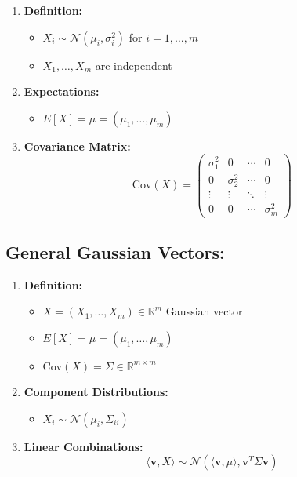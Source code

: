 \documentclass{article}
\begin{document}
\begin{enumerate}
    \item \textbf{Definition:}
    \begin{itemize}
        \item $X_i \sim \mathcal{N}(\mu_i, \sigma_i^2)$ for $i = 1, \ldots, m$
        \item $X_1, \ldots, X_m$ are independent
    \end{itemize}

    \item \textbf{Expectations:}
    \begin{itemize}
        \item $E[X] = \mu = (\mu_1, \ldots, \mu_m)$
    \end{itemize}

    \item \textbf{Covariance Matrix:}
    \[
    \text{Cov}(X) = \begin{pmatrix}
        \sigma_1^2 & 0 & \cdots & 0 \\
        0 & \sigma_2^2 & \cdots & 0 \\
        \vdots & \vdots & \ddots & \vdots \\
        0 & 0 & \cdots & \sigma_m^2
    \end{pmatrix}
    \]
\end{enumerate}

\subsection*{General Gaussian Vectors:}

\begin{enumerate}
    \item \textbf{Definition:}
    \begin{itemize}
        \item $X = (X_1, \ldots, X_m) \in \mathbb{R}^m$ Gaussian vector
        \item $E[X] = \mu = (\mu_1, \ldots, \mu_m)$
        \item $\text{Cov}(X) = \Sigma \in \mathbb{R}^{m \times m}$
    \end{itemize}

    \item \textbf{Component Distributions:}
    \begin{itemize}
        \item $X_i \sim \mathcal{N}(\mu_i, \Sigma_{ii})$
    \end{itemize}

    \item \textbf{Linear Combinations:}
    \[
    \langle \mathbf{v}, X \rangle \sim \mathcal{N}(\langle \mathbf{v}, \mu \rangle, \mathbf{v}^T \Sigma \mathbf{v})
    \]
\end{enumerate}
\end{document}
